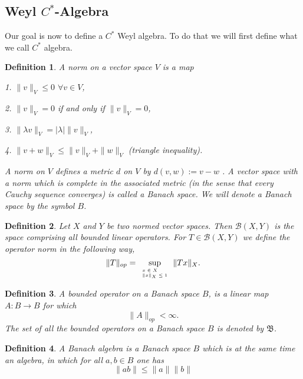 \documentclass[10pt]{article} %
\numberwithin{equation}{section}
\numberwithin{equation}{section} %
\numberwithin{figure}{section} %
\newcommand{\norm}[1]{\|{#1}\|} %
\theoremstyle{theoremsf}
\theoremstyle{definitionsf}
\newtheorem{dfn}{Definition}[section]
\begin{document}
\subsection{Weyl $C^{\ast}$-Algebra}


\noindent
Our goal is now to define a $C^{\ast}$ Weyl algebra. To do that we will first define what we call $C^{\ast}$ algebra. 

\begin{dfn}
 A norm on a vector space $V$ is a map
 \begin{description}
  \item 1. $\norm{v}_{V} \leq 0$ $\forall v \in V$,
  \item 2. $\norm{v}_{V} = 0$ if and only if $\norm{v}_{V} = 0$,
  \item 3. $\norm{\lambda v}_{V} = |\lambda| \norm{v}_{V}$,
  \item 4. $\norm{v + w}_{V} \leq \norm{v}_{V} + \norm{w}_{V}$ (triangle inequality).
 \end{description}
 A norm on $V$ defines a metric $d$ on $V$ by $d(v, w) := v - w$ . A vector space with a norm which is complete in the associated metric (in the sense that every Cauchy sequence converges) is called a Banach space. We will denote a Banach space by the symbol $B$.
 \end{dfn}
 
 \begin{dfn}
 Let $X$ and $Y$ be two normed vector spaces. Then $\mathcal{B}(X,Y)$ is the space comprising all bounded linear operators. For $T \in  \mathcal{B}(X,Y)$ we define the operator norm in the following way,
 \begin{equation}
 \norm{T}_{op} = \sup_{ \tiny{
  \begin{array}{l}
   x \in X \\
   \norm{x}_{X} \leq 1
  \end{array} } }
 \norm{Tx}_{X}. 
\end{equation}
\end{dfn}

\begin{dfn}
 A bounded operator on a Banach space $B$, is a linear map $A : B \rightarrow B$ for which 
 \begin{equation}
  \norm{A}_{op} < \infty.
 \end{equation}
 The set of all the bounded operators on a Banach space $B$ is denoted by $\mathfrak{B}$.
\end{dfn}

\begin{dfn}
 A Banach algebra is a Banach space $B$ which is at the same time an algebra, in which for all $a, b \in B$ one has
 \begin{equation}
  \norm{ab} \leq \norm{a} \norm{b}
 \end{equation}
\end{dfn}
\end{document}
